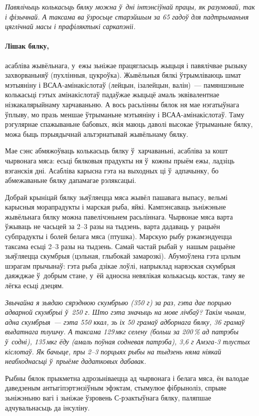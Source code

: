 \emph{Павялічыць колькасьць бялку можна ў~дні інтэнсіўнай працы, як разумовай, так і фізычнай. А таксама ва ўзросьце старэйшым за 65 гадоў для падтрыманьня цяглічнай масы і прафіляктыкі саркапэніі.}

\paragraph{Лішак бялку,} асабліва жывёльнага, у~ежы зьніжае працягласьць жыцьця і павялічвае рызыку захворваньняў (пухлінныя, цукроўка). Жывёльныя бялкі ўтрымліваюць шмат мэтыяніну і ВСАА-амінакіслотаў (лейцын, ізалейцын, валін)~--- памяншэньне колькасьці гэтых амінакіслотаў падаўжае жыцьцё амаль эквівалентнае нізкакалярыйнаму харчаваньню. А вось расьлінны бялок ня мае нэгатыўнага ўплыву, мо празь меншае ўтрыманьне мэтыяніну і ВСАА-амінакіслотаў. Таму рэгулярнае спажываньне бабовых, якія маюць даволі высокае ўтрыманьне бялку, можа быць пэрыядычнай альтэрнатывай жывёльнаму бялку.

Мае сэнс абмяжоўваць колькасьць бялку ў~харчаваньні, асабліва за кошт чырвонага мяса: есьці бялковыя прадукты ня ў~кожны прыём ежы, ладзіць вэганскія дні. Асабліва карысна гэта на выходных ці ў~адпачынку, бо абмежаваньне бялку дапамагае рэляксацыі.

Добрай крыніцай бялку зьяўляецца мяса жывёл пашавага выпасу, вельмі карысныя морапрадукты і марская рыба, яйкі. Кампэнсаваць зьніжэньне жывёльнага бялку можна павелічэньнем расьліннага. Чырвонае мяса варта ўжываць не часьцей за 2--3 разы на тыдзень, варта дадаваць у~рацыён субпрадукты і болей белага мяса (птушка). Марскую рыбу рэкамэндуецца таксама есьці 2--3 разы на тыдзень. Самай частай рыбай у~нашым рацыёне зьяўляецца скумбрыя (цэльная, глыбокай замарозкі). Абумоўлена гэта цэлым шэрагам прычынаў: гэта рыба дзікае лоўлі, напрыклад нарвэская скумбрыя даяжджае ў~добрым стане, у~ёй адносна невялікая колькасьць костак, таму яе лёгка есьці дзецям.

\emph{Звычайна я зьядаю сярэднюю скумбрыю (350 г) за раз, гэта дае порцыю адварной скумбрыі ў~250 г. Што гэта значыць на мове лічбаў? Такім чынам, адна скумбрыя~--- гэта 550 ккал, зь іх 50 грамаў адборнага бялку, 36 грамаў выдатнага тлушчу. А таксама 129\,мкг селену (больш за 200\,\% ад патрэбы ў~содні), 135\,мкг ёду (амаль поўная содневая патрэба), 3,6 г Амэга-3 тлустых кіслотаў. Як бачыце, пры 2--3 порцыях рыбы на тыдзень няма ніякай неабходнасьці ў~прыёме дадатковых дабавак.}

Рыбны бялок прыкметна адрозьніваецца ад чырвонага і белага мяса, ён валодае даведзеным антыгіпэртэнзіўным эфэктам, стымулюе фібрыноліз, спрыяе зьніжэньню вагі і зьніжае ўзровень С-рэактыўнага бялку, паляпшае адчувальнасьць да інсуліну. 


